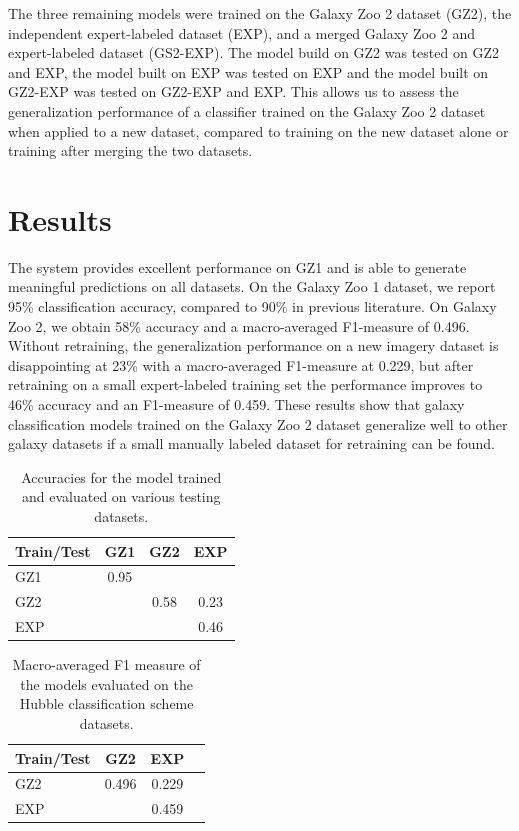 \documentclass{article}
\begin{document}
The three remaining models were trained on the Galaxy Zoo 2 dataset (GZ2), the independent expert-labeled dataset (EXP), and a merged Galaxy Zoo 2 and expert-labeled dataset (GS2-EXP). The model build on GZ2 was tested on GZ2 and EXP, the model built on EXP was tested on EXP and the model built on GZ2-EXP was tested on GZ2-EXP and EXP. This allows us to assess the generalization performance of a classifier trained on the Galaxy Zoo 2 dataset when applied to a new dataset, compared to training on the new dataset alone or training after merging the two datasets.

\section{Results}
The system provides excellent performance on GZ1 and is able to generate meaningful predictions on all datasets. On the Galaxy Zoo 1 dataset, we report 95\% classification accuracy, compared to 90\% in previous literature. On Galaxy Zoo 2, we obtain 58\% accuracy and a macro-averaged F1-measure of 0.496. Without retraining, the generalization performance on a new imagery dataset is disappointing at 23\% with a macro-averaged F1-measure at 0.229, but after retraining on a small expert-labeled training set the performance improves to 46\% accuracy and an F1-measure of 0.459. These results show that galaxy classification models trained on the Galaxy Zoo 2 dataset generalize well to other galaxy datasets if a small manually labeled dataset for retraining can be found. 

\begin{table}
\begin{center}
\begin{tabular}{l|c|c|c}
Train/Test	&	GZ1		&	GZ2		&	EXP		\\ \hline
GZ1			&	0.95	&			&			\\
GZ2			&			&	0.58	&	0.23	\\
EXP			&			&			&	0.46
\end{tabular}
\end{center}
\caption{Accuracies for the model trained and evaluated on various testing datasets.}
\end{table}

\begin{table}
\begin{center}
\begin{tabular}{l|c|c|c}
Train/Test	&	GZ2		&	EXP			\\ \hline
GZ2			&	0.496	&	0.229		\\
EXP			&			&	0.459
\end{tabular}
\end{center}
\caption{Macro-averaged F1 measure of the models evaluated on the Hubble classification scheme datasets.}
\end{table}
\end{document}
